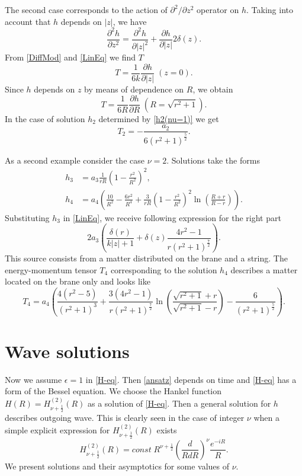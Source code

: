 \documentclass[letterpaper,12pt]{article}
\begin{document}
The second case corresponds to the action of $\partial^2/\partial
z^2$ operator on $h$. Taking into account that $h$ depends on
$|z|$, we have
\begin {equation}
\label{DiffMod} \frac{\partial^2 h}{\partial z^2}=\frac{\partial^2
h}{\partial |z|^2}+\frac{\partial h}{\partial |z|}2\delta(z).
\end{equation}
From \eqref{DiffMod} and \eqref{LinEq} we find $T$
\begin {equation}
\label{TFromZ} T=\frac{1}{6k}\frac{\partial h}{\partial
|z|}\;(z=0).
\end{equation}
Since  $h$ depends on $z$ by means of dependence on $R$, we obtain
\begin {equation}
\label{TFromR} T=\frac{1}{6R}\frac{\partial h}{\partial
R}\;(R=\sqrt{r^2+1}).
\end{equation}
In the case of solution $h_2$ determined by \eqref{h2(nu=1)} we
get
\begin {equation}
\label{T_2} T_2=-\frac{a_2}{6(r^2+1)^{\frac{5}{2}}}.
\end{equation}

As a second example consider  the case $\nu=2$. Solutions take the
forms
\begin{align}
\label{h3(nu=2)}
 h_3&=a_3\frac{1}{rR}\left(1-\frac{r^2}{R^2}\right)^2,\\
 \label{h4(nu=2)}
 h_4&=a_4\left(\frac{10}{R^2}-\frac{6r^2}{R^4}+
 \frac{3}{rR}\left(1-\frac{r^2}{R^2}\right)^2\ln\left(\frac{R+r}{R-r}\right)\right).
\end{align}
Substituting   $h_3$ in \eqref{LinEq}, we receive following
expression for the right part
\begin {equation}
\label{T_3} 2a_3\left(\frac{\delta(r)}{k|z|+1}+
\delta(z)\frac{4r^2-1}{r(r^2+1)^\frac{7}{2}}\right).
\end{equation}
This source consists from  a matter distributed on the brane and a
string. The energy-momentum tensor $T_4$ corresponding to the
solution $h_4$ describes a matter located on the brane only and
looks like
\begin {equation}
\label{T_4} T_4=a_4\left(\frac{4(r^2-5)}{(r^2+1)^3}+
\frac{3(4r^2-1)}{r(r^2+1)^\frac{7}{2}}
\ln\left(\frac{\sqrt{r^2+1}+r}{\sqrt{r^2+1}-r}\right)
-\frac{6}{(r^2+1)^\frac{5}{2}}\right).
\end{equation}

\section{Wave solutions}\label{wave}
Now we assume $\epsilon=1$ in  \eqref{H-eq}. Then \eqref{ansatz}
depends on time and  \eqref{H-eq} has a form of the Bessel
equation. We choose the Hankel function
$H(R)=H_{\nu+\frac{1}{2}}^{(2)}(R)$ as a solution of \eqref{H-eq}.
Then a general solution for $h$ describes outgoing wave. This is
clearly seen in the case  of integer $\nu$ when a simple explicit
expression for $H_{\nu+\frac{1}{2}}^{(2)}(R)$ exists
\begin {equation}
\label{Hankel}
 H_{\nu+\frac{1}{2}}^{(2)}(R) = const\;
 R^{\nu+\frac{1}{2}}\left(\frac{d}{RdR}\right)^{\nu}\frac{e^{-iR}}{R}.
\end{equation}
We present solutions and their asymptotics for some values of
$\nu$.
\end{document}
